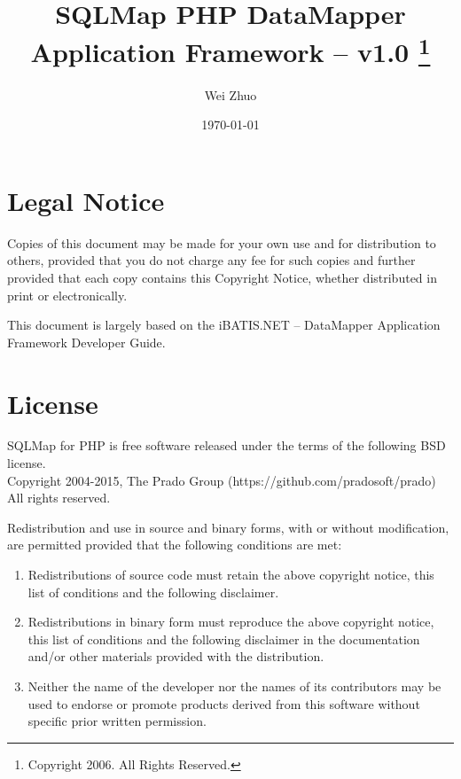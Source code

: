 \documentclass{book}
\title{\Huge \bfseries SQLMap PHP DataMapper Application Framework --
v1.0
    \thanks{Copyright 2006. All Rights Reserved.}
}
\author{Wei Zhuo}
\date{\today}
\begin{document}
\maketitle

\pagestyle{plain}
\tableofcontents

\chapter*{Legal Notice}

Copies of this document may be made for your own use and for distribution to
others, provided that you do not charge any fee for such copies and further
provided that each copy contains this Copyright Notice, whether distributed in
print or electronically.

This document is largely based on the iBATIS.NET -- DataMapper Application
Framework Developer Guide.

\chapter*{License}
SQLMap for PHP is free software released under the terms of the following BSD license.\\
Copyright 2004-2015, The Prado Group (https://github.com/pradosoft/prado)\\
All rights reserved.

Redistribution and use in source and binary forms, with or without
modification, are permitted provided that the following conditions are met:
\begin{enumerate}
    \item Redistributions of source code must retain the above copyright notice,
this list of conditions and the following disclaimer.

 \item Redistributions in binary form must reproduce the above copyright notice,
this list of conditions and the following disclaimer in the documentation
and/or other materials provided with the distribution.

\item Neither the name of the developer nor the names of its contributors may
be used to endorse or promote products derived from this software without
specific prior written permission.
\end{enumerate}
\end{document}
